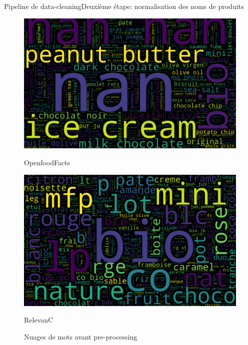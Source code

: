 \documentclass[ignorenonframetext,]{beamer}
\begin{document}
\begin{frame}{Pipeline de data-cleaning}{Deuxième étape: normalisation des noms de produits}
    \begin{figure}[ht]
        \begin{minipage}[b]{0.45\linewidth}
            \centering
            \includegraphics[width=\textwidth]{images/openfood_tokenized.png}
            \caption{OpenfoodFacts}
            \label{fig: wordcloud openfood}
        \end{minipage}
        \hspace{0.5cm}
        \begin{minipage}[b]{0.45\linewidth}
            \centering
            \includegraphics[width=\textwidth]{images/relevanc_tokenized.png}
            \caption{RelevanC}
            \label{fig: wordcloud relevanc}
        \end{minipage}
        \caption{Nuages de mots avant pre-processing}
    \end{figure}


\end{frame}
\end{document}
